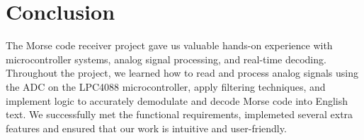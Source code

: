 \documentclass{article}
\begin{document}
\section{Conclusion}
The Morse code receiver project gave us valuable hands-on experience with microcontroller systems, 
analog signal processing, and real-time decoding. Throughout the project, 
we learned how to read and process analog signals using the ADC on the LPC4088 microcontroller, 
apply filtering techniques, and implement logic to accurately demodulate and decode Morse code 
into English text.
We successfully met the functional requirements, implemeted several extra features and  ensured 
that our work is intuitive and user-friendly. 
\end{document}
